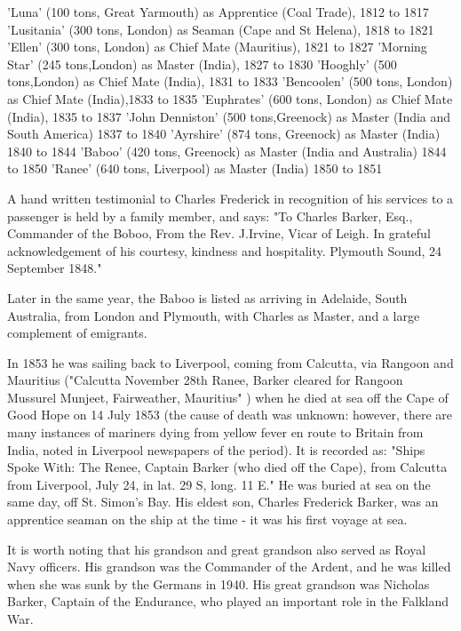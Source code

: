 'Luna' (100 tons, Great Yarmouth) as Apprentice (Coal Trade), 1812 to 1817
'Lusitania' (300 tons, London) as Seaman (Cape and St Helena), 1818 to 1821
'Ellen' (300 tons, London) as Chief Mate (Mauritius), 1821 to 1827
'Morning Star' (245 tons,London) as Master (India), 1827 to 1830
'Hooghly' (500 tons,London) as Chief Mate (India), 1831 to 1833
'Bencoolen' (500 tons, London) as Chief Mate (India),1833 to 1835
'Euphrates' (600 tons, London) as Chief Mate (India), 1835 to 1837
'John Denniston' (500 tons,Greenock) as Master (India and South America) 1837 to 1840
'Ayrshire' (874 tons, Greenock) as Master (India) 1840 to 1844
'Baboo' (420 tons, Greenock) as Master (India and Australia) 1844 to 1850
'Ranee' (640 tons, Liverpool) as Master (India) 1850 to 1851
\cite{CFBShipList}


A hand written testimonial to Charles Frederick in recognition of his services to a passenger is held by a family member, and says:
"To Charles Barker, Esq., Commander of the Boboo,
From the Rev. J.Irvine, Vicar of Leigh.
In grateful acknowledgement of his courtesy, kindness and hospitality.
Plymouth Sound, 24 September 1848."

Later in the same year, the Baboo is listed as arriving in Adelaide, South Australia, from London and Plymouth, with Charles as Master, and a large complement of emigrants.\cite{CFBBaboo}

In 1853 he was sailing back to Liverpool, coming from Calcutta, via Rangoon and Mauritius ("Calcutta November 28th Ranee, Barker cleared for Rangoon Mussurel Munjeet, Fairweather, Mauritius" \cite{CFBRanee}) when he died at sea off the Cape of Good Hope on 14 July 1853 (the cause of death was unknown: however, there are many instances of mariners dying from yellow fever en route to Britain from India, noted in Liverpool newspapers of the period). It is recorded as:
"Ships Spoke With: The Renee, Captain Barker (who died off the Cape), from Calcutta from Liverpool, July 24, in lat. 29 S, long. 11 E."\cite{CFBDeath}
He was buried at sea on the same day, off St. Simon's Bay. His eldest son, Charles Frederick Barker, was an apprentice seaman on the ship at the time - it was his first voyage at sea.

It is worth noting that his grandson and great grandson also served as Royal Navy officers. His grandson was the Commander of the Ardent, and he was killed when she was sunk by the Germans in 1940. His great grandson was Nicholas Barker, Captain of the Endurance, who played an important role in the Falkland War.

